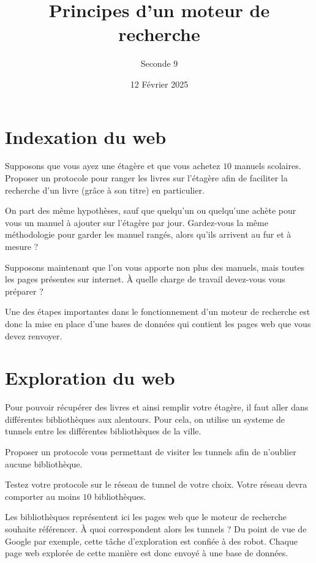 \documentclass{article}
\title{Principes d'un moteur de recherche}
\date{12 Février 2025}
\author{Seconde 9}
\begin{document}
\maketitle
\section{Indexation du web}
\begin{enumquestions}
\item Supposons que vous ayez une étagère et que vous achetez $10$ manuels scolaires. Proposer un protocole pour ranger les livres sur l'étagère afin de faciliter la recherche d'un livre (grâce à son titre) en particulier.
\item On part des même hypothèses, sauf que quelqu'un ou quelqu'une achète pour vous un manuel à ajouter sur l'étagère par jour. Gardez-vous la même méthodologie pour garder les manuel rangés, alors qu'ils arrivent au fur et à mesure ?
\item Supposons maintenant que l'on vous apporte non plus des manuels, mais toutes les pages présentes sur internet. À quelle charge de travail devez-vous vous préparer ?
\end{enumquestions}
Une des étapes importantes dans le fonctionnement d'un moteur de recherche est donc la mise en place d'une bases de données qui contient les pages web que vous devez renvoyer.  
\section{Exploration du web}
\begin{enumquestions}
\item Pour pouvoir récupérer des livres et ainsi remplir votre étagère, il faut aller dans différentes bibliothèques aux alentours. Pour cela, on utilise un systeme de tunnels entre les différentes bibliothèques de la ville.
\begin{center}
\end{center}
Proposer un protocole vous permettant de visiter les tunnels afin de n'oublier aucune bibliothèque.
\item Testez votre protocole sur le réseau de tunnel de votre choix. Votre réseau devra comporter au moins $10$ bibliothèques.
\item Les bibliothèques représentent ici les pages web que le moteur de recherche souhaite référencer. À quoi correspondent alors les tunnels ?
Du point de vue de Google par exemple, cette tâche d'exploration est confiée à des robot. Chaque page web explorée de cette manière est donc envoyé à une base de données.
\end{enumquestions}
\end{document}
